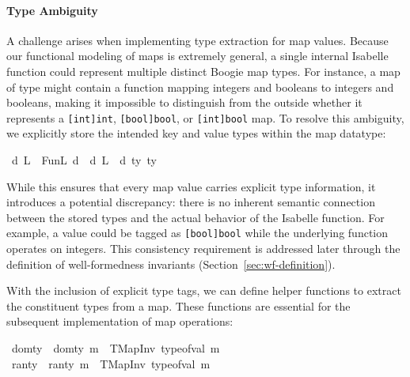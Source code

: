 \paragraph{Type Ambiguity}
A challenge arises when implementing type extraction for map values.
Because our functional modeling of maps is extremely general,
a single internal Isabelle function could represent multiple distinct Boogie map types.
For instance, a map of type  might contain a function mapping integers and booleans to integers and booleans,
making it impossible to distinguish from the outside whether it represents
a \lstinline[columns=fixed]{[int]int}, \lstinline[columns=fixed]{[bool]bool}, or \lstinline[columns=fixed]{[int]bool} map.
To resolve this ambiguity, we explicitly store the intended key and value types within the map datatype:

\begin{isabellebody}
\isanewline
{}\isamarkupfalse%
\ {\isacharprime}{\kern0pt}d\ L\ {\isacharequal}{\kern0pt}\ FunL\ {\isachardoublequoteopen}{\isacharprime}{\kern0pt}d\ {\isasymRightarrow}\ {\isacharprime}{\kern0pt}d\ L\ {\isacharplus}{\kern0pt}\ {\isacharprime}{\kern0pt}d{\isachardoublequoteclose}\ ty\ ty
\end{isabellebody}


While this ensures that every map value carries explicit type information,
it introduces a potential discrepancy:
there is no inherent semantic connection between the stored types and the actual behavior of the Isabelle function.
For example, a value could be tagged as \lstinline[columns=fixed]{[bool]bool} while the underlying function operates on integers.
This consistency requirement is addressed later through the definition of well-formedness invariants (Section~\ref{sec:wf-definition}).



With the inclusion of explicit type tags,
we can define helper functions to extract the constituent types from a map.
These functions are essential for the subsequent implementation of map operations:
\begin{isabellebody}\isanewline
{}\isamarkupfalse%
\ dom{\isacharunderscore}{\kern0pt}ty\ \ {\isachardoublequoteopen}dom{\isacharunderscore}{\kern0pt}ty\ m\ {\isacharequal}{\kern0pt}\ TMapInv{}\ {\isacharparenleft}{\kern0pt}type{\isacharunderscore}{\kern0pt}of{\isacharunderscore}{\kern0pt}val\ m{\isacharparenright}{\kern0pt}{\isachardoublequoteclose}\isanewline
{}\isamarkupfalse%
\ ran{\isacharunderscore}{\kern0pt}ty\ \ {\isachardoublequoteopen}ran{\isacharunderscore}{\kern0pt}ty\ m\ {\isacharequal}{\kern0pt}\ TMapInv{}\ {\isacharparenleft}{\kern0pt}type{\isacharunderscore}{\kern0pt}of{\isacharunderscore}{\kern0pt}val\ m{\isacharparenright}{\kern0pt}{\isachardoublequoteclose}
\end{isabellebody}


